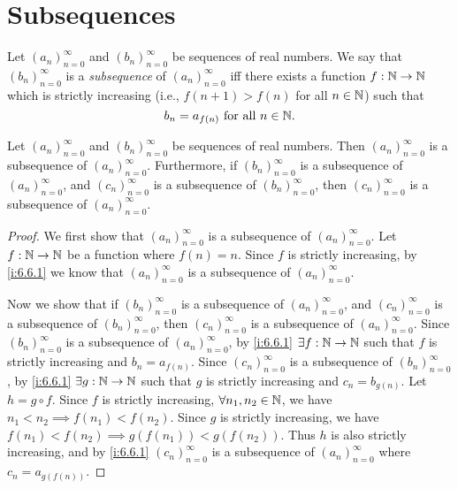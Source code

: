 \section{Subsequences}\label{i:sec:6.6}

\begin{defn}[Subsequences]\label{i:6.6.1}
  Let \((a_n)_{n = 0}^\infty\) and \((b_n)_{n = 0}^\infty\) be sequences of real numbers.
  We say that \((b_n)_{n = 0}^\infty\) is a \emph{subsequence} of \((a_n)_{n = 0}^\infty\) iff there exists a function \(f : \mathbb{N} \to \mathbb{N}\) which is strictly increasing (i.e., \(f(n + 1) > f(n)\) for all \(n \in \mathbb{N}\)) such that
  \[
    b_n = a_{f(n)} \text{ for all } n \in \mathbb{N}.
  \]
\end{defn}

\setcounter{thm}{3}
\begin{lem}\label{i:6.6.4}
  Let \((a_n)_{n = 0}^\infty\) and \((b_n)_{n = 0}^\infty\) be sequences of real numbers.
  Then \((a_n)_{n = 0}^\infty\) is a subsequence of \((a_n)_{n = 0}^\infty\).
  Furthermore, if \((b_n)_{n = 0}^\infty\) is a subsequence of \((a_n)_{n = 0}^\infty\), and \((c_n)_{n = 0}^\infty\) is a subsequence of \((b_n)_{n = 0}^\infty\), then \((c_n)_{n = 0}^\infty\) is a subsequence of \((a_n)_{n = 0}^\infty\).
\end{lem}

\begin{proof}
  We first show that \((a_n)_{n = 0}^\infty\) is a subsequence of \((a_n)_{n = 0}^\infty\).
  Let \(f : \mathbb{N} \to \mathbb{N}\) be a function where \(f(n) = n\).
  Since \(f\) is strictly increasing, by \cref{i:6.6.1} we know that \((a_n)_{n = 0}^\infty\) is a subsequence of \((a_n)_{n = 0}^\infty\).

  Now we show that if \((b_n)_{n = 0}^\infty\) is a subsequence of \((a_n)_{n = 0}^\infty\), and \((c_n)_{n = 0}^\infty\) is a subsequence of \((b_n)_{n = 0}^\infty\), then \((c_n)_{n = 0}^\infty\) is a subsequence of \((a_n)_{n = 0}^\infty\).
  Since \((b_n)_{n = 0}^\infty\) is a subsequence of \((a_n)_{n = 0}^\infty\), by \cref{i:6.6.1} \(\exists f : \mathbb{N} \to \mathbb{N}\) such that \(f\) is strictly increasing and \(b_n = a_{f(n)}\).
  Since \((c_n)_{n = 0}^\infty\) is a subsequence of \((b_n)_{n = 0}^\infty\), by \cref{i:6.6.1} \(\exists g : \mathbb{N} \to \mathbb{N}\) such that \(g\) is strictly increasing and \(c_n = b_{g(n)}\).
  Let \(h = g \circ f\).
  Since \(f\) is strictly increasing, \(\forall n_1, n_2 \in \mathbb{N}\), we have \(n_1 < n_2 \implies f(n_1) < f(n_2)\).
  Since \(g\) is strictly increasing, we have \(f(n_1) < f(n_2) \implies g(f(n_1)) < g(f(n_2))\).
  Thus \(h\) is also strictly increasing, and by \cref{i:6.6.1} \((c_n)_{n = 0}^\infty\) is a subsequence of \((a_n)_{n = 0}^\infty\) where \(c_n = a_{g(f(n))}\).
\end{proof}


